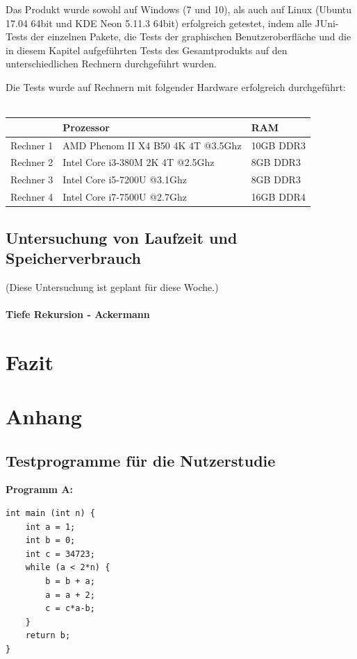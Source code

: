 \documentclass[parskip=full]{scrartcl}
\begin{document}
Das Produkt wurde sowohl auf Windows (7 und 10), als auch auf Linux (Ubuntu 17.04 64bit und KDE Neon 5.11.3 64bit) erfolgreich getestet, indem alle JUni-Tests der einzelnen Pakete, die Tests der graphischen Benutzeroberfläche und die in diesem Kapitel aufgeführten Tests des Gesamtprodukts auf den unterschiedlichen Rechnern durchgeführt wurden.

Die Tests wurde auf Rechnern mit folgender Hardware erfolgreich durchgeführt: \\ \\
\begin{tabular}{l||l|l}
   	 & Prozessor & RAM \\
	\hline
	\hline
	Rechner 1 & AMD Phenom II X4 B50 4K 4T @3.5Ghz & 10GB DDR3 \\
	Rechner 2 & Intel Core i3-380M 2K 4T @2.5Ghz & 8GB DDR3 \\
	Rechner 3 & Intel Core i5-7200U @3.1Ghz & 8GB DDR3 \\
	Rechner 4 & Intel Core i7-7500U @2.7Ghz & 16GB DDR4\\
\end{tabular}


\subsection{Untersuchung von Laufzeit und Speicherverbrauch}
(Diese Untersuchung ist geplant für diese Woche.)

\paragraph{Tiefe Rekursion - Ackermann}

\newpage
\section{Fazit}



\newpage

\printglossary[style=altlist, toctitle=Glossar]
\newpage

\section{Anhang}
\subsection{Testprogramme für die Nutzerstudie}\label{code}
\textbf{Programm A:}
\begin{verbatim}
int main (int n) {
	int a = 1;
	int b = 0;
	int c = 34723;
	while (a < 2*n) {
		b = b + a;
		a = a + 2;
		c = c*a-b;
	}
	return b;
}
\end{verbatim}
\end{document}
